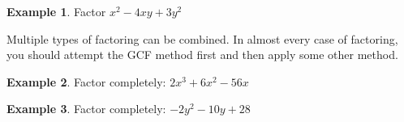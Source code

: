 \documentclass[addpoints,12pt]{exam}
\theoremstyle{definition}
\theoremstyle{break}
\theoremstyle{break}
\newtheorem{example}{Example}[subsection]
\begin{document}
\begin{example}
Factor $x^2 - 4xy + 3y^2$
\vspace{2in}
\end{example}

\noindent Multiple types of factoring can be combined. In almost every case of factoring, you should attempt the GCF method first and then apply some other method.
\vspace{.15in}

\begin{example}
Factor completely: $2x^3 + 6x^2 - 56x$
\vspace{1.5in}
\end{example}

\begin{example}
Factor completely: $-2y^2 - 10y + 28$
\end{example}
\end{document}
